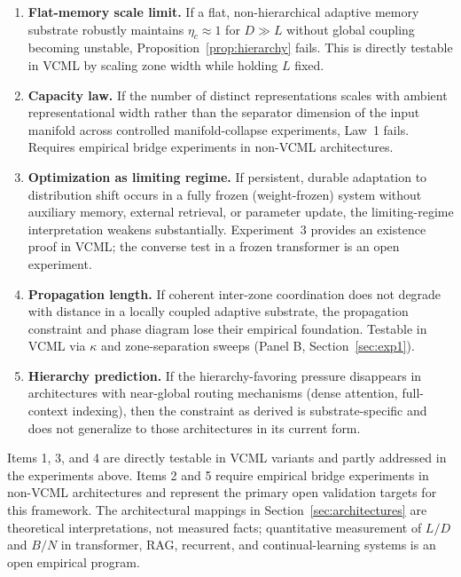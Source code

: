 \documentclass[12pt]{article}
\begin{document}
\begin{enumerate}
  \item \textbf{Flat-memory scale limit.} If a flat, non-hierarchical adaptive memory substrate robustly maintains $\eta_c \approx 1$ for $D \gg L$ without global coupling becoming unstable, Proposition~\ref{prop:hierarchy} fails. This is directly testable in VCML by scaling zone width while holding $L$ fixed.

  \item \textbf{Capacity law.} If the number of distinct representations scales with ambient representational width rather than the separator dimension of the input manifold across controlled manifold-collapse experiments, Law~1 fails. Requires empirical bridge experiments in non-VCML architectures.

  \item \textbf{Optimization as limiting regime.} If persistent, durable adaptation to distribution shift occurs in a fully frozen (weight-frozen) system without auxiliary memory, external retrieval, or parameter update, the limiting-regime interpretation weakens substantially. Experiment~3 provides an existence proof in VCML; the converse test in a frozen transformer is an open experiment.

  \item \textbf{Propagation length.} If coherent inter-zone coordination does not degrade with distance in a locally coupled adaptive substrate, the propagation constraint and phase diagram lose their empirical foundation. Testable in VCML via $\kappa$ and zone-separation sweeps (Panel B, Section~\ref{sec:exp1}).

  \item \textbf{Hierarchy prediction.} If the hierarchy-favoring pressure disappears in architectures with near-global routing mechanisms (dense attention, full-context indexing), then the constraint as derived is substrate-specific and does not generalize to those architectures in its current form.
\end{enumerate}

Items 1, 3, and 4 are directly testable in VCML variants and partly addressed in the experiments above. Items 2 and 5 require empirical bridge experiments in non-VCML architectures and represent the primary open validation targets for this framework. The architectural mappings in Section~\ref{sec:architectures} are theoretical interpretations, not measured facts; quantitative measurement of $L/D$ and $B/N$ in transformer, RAG, recurrent, and continual-learning systems is an open empirical program.
\end{document}
